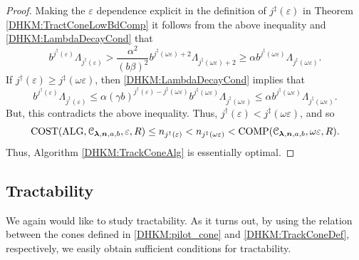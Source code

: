 \documentclass[USenglish]{article}
\theoremstyle{dgthm}
\theoremstyle{dgthm}
\theoremstyle{dgthm}
\theoremstyle{dgthm}
\theoremstyle{dgdef}
\theoremstyle{definition}
\DeclareMathOperator{\DHKMALG}{ALG}
\DeclareMathOperator{\DHKMCOST}{COST}
\DeclareMathOperator{\COMP}{COMP}
\begin{document}
\begin{proof}
Making the $\varepsilon$ dependence explicit in the definition of $j^\ddagger(\varepsilon)$ in Theorem \ref{DHKM:TractConeLowBdComp} it follows from the above inequality and \eqref{DHKM:LambdaDecayCond} that
\begin{equation*}
    b^{j^\dagger(\varepsilon)} \Lambda_{j^\dagger(\varepsilon) } 
     > \frac{\alpha^2}{(b\beta)^2} b^{j^\ddagger(\omega\varepsilon)+2} \Lambda_{j^\ddagger(\omega \varepsilon) + 2 } 
    \ge \alpha b^{j^\ddagger(\omega\varepsilon)} \Lambda_{j^\ddagger(\omega \varepsilon)}.
\end{equation*}
If $j^{\dagger}(\varepsilon) \ge j^{\ddagger}(\omega \varepsilon)$, then \eqref{DHKM:LambdaDecayCond} implies that 
\[
 b^{j^\dagger(\varepsilon)} \Lambda_{j^\dagger(\varepsilon) } \le \alpha (\gamma b)^{j^{\dagger}(\varepsilon) - j^{\ddagger}(\omega \varepsilon)} b^{j^{\ddagger}(\omega \varepsilon) } \Lambda_{j^\ddagger(\omega \varepsilon) } \le \alpha b^{j^{\ddagger}(\omega \varepsilon) } \Lambda_{j^\ddagger(\omega \varepsilon) }.
\]
But, this contradicts the above inequality.  Thus, $j^\dagger(\varepsilon) < j^\ddagger(\omega \varepsilon)$, and so
\[
\DHKMCOST(\DHKMALG,\calC_{\boldsymbol{\lambda},\bsn,a,b},\varepsilon,R) \le n_{j^\dagger(\varepsilon)} < n_{j^\ddagger(\omega \varepsilon)} < \COMP(\calC_{\boldsymbol{\lambda},\bsn,a,b},\omega \varepsilon,R).
\]
Thus,  Algorithm \ref{DHKM:TrackConeAlg} is essentially optimal.
\end{proof}




\subsection{Tractability}\label{DHKM:SecDecayTract}



We again would like to study tractability. As it turns out, by using the relation 
between the cones defined in \eqref{DHKM:pilot_cone} and \eqref{DHKM:TrackConeDef}, respectively, we 
easily obtain sufficient conditions for tractability. 
\end{document}
